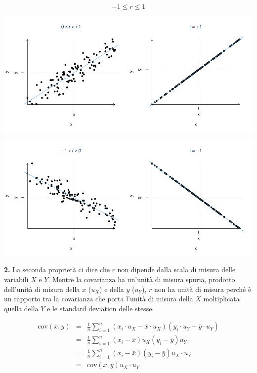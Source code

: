 \documentclass[
  11pt,
]{book}
\theoremstyle{mytheoremstyle}
\theoremstyle{mydefstyle}
\begin{document}
\[-1 \le r \le 1\]

\begin{center}\includegraphics{Appunti_di_Statistica_2025_files/figure-latex/17-regressione-I-47-1} \end{center}

\begin{center}\includegraphics{Appunti_di_Statistica_2025_files/figure-latex/17-regressione-I-48-1} \end{center}

\textbf{2.} La seconda proprietà ci dice che \(r\) non dipende dalla scala di misura delle variabili
\(X\) e \(Y\). Mentre la covarianza ha un'unità di misura spuria, prodotto
dell'unità di misura della \(x\) (\(u_X\)) e della \(y\) (\(u_Y\)), \(r\) non
ha unità di misura perché è un rapporto tra la covarianza che porta l'unità di misura della \(X\)
moltiplicata quella della \(Y\) e le standard deviation delle stesse.

\begin{eqnarray*}
\text{cov}(x,y)&=&\frac 1 n\sum_{i=1}^n{(x_i\cdot u_X-\bar x\cdot u_X)(y_i\cdot u_Y-\bar y\cdot u_Y)}\\
  &=&\frac 1 n\sum_{i=1}^n{(x_i-\bar x)u_X(y_i-\bar y)u_Y}\\
  &=&\frac 1 n\sum_{i=1}^n{(x_i-\bar x)(y_i-\bar y)u_X\cdot u_Y}  \\
  &=&\text{cov}(x,y)u_X\cdot u_Y
\end{eqnarray*}
\end{document}
